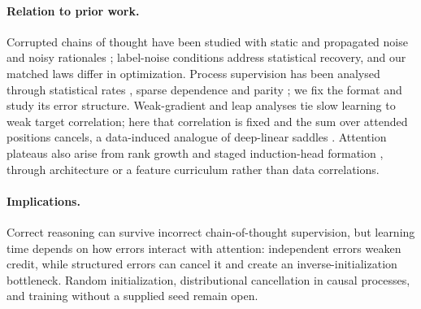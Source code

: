 \paragraph{Relation to prior work.}
\label{sec:related}

Corrupted chains of thought have been studied with static and propagated noise \citep{havrilla2024noise} and noisy rationales
\citep{zhou2024noisyrationales}; label-noise conditions \citep{natarajan2013noisy,patrini2017loss} address statistical recovery, and our matched laws differ in optimization.
Process supervision \citep{nye2021scratchpads,wei2022cot,uesato2022solving,lightman2023verify} has been analysed through statistical rates
\citep{jia2025verify,hanneke2026samplecomplexityautoregressivereasoning,pmlr-v291-joshi25a}, sparse dependence \citep{wen2024sparse} and parity \citep{kim2024parity}; we fix the format
and study its error structure. Weak-gradient and leap analyses \citep{shalevshwartz2017failures,abbe2025parities,abbe2021staircase,abbe2023sgd} tie slow learning
to weak target correlation; here that correlation is fixed and the sum over attended positions cancels, a data-induced analogue of deep-linear saddles
\citep{saxe2014exact,shamir2019exponential}. Attention plateaus also arise from rank growth \citep{boixadsera2023rank} and staged induction-head
formation \citep{bietti2023birth,reddy2024mechanistic,edelman2024evolution}, through architecture or a feature curriculum rather than data correlations.

\paragraph{Implications.}
\label{sec:conclusion}

Correct reasoning can survive incorrect chain-of-thought supervision, but learning time depends on how errors interact with attention:
independent errors weaken credit, while structured errors can cancel it and create an inverse-initialization bottleneck. Random initialization,
distributional cancellation in causal processes, and training without a supplied seed remain open.
